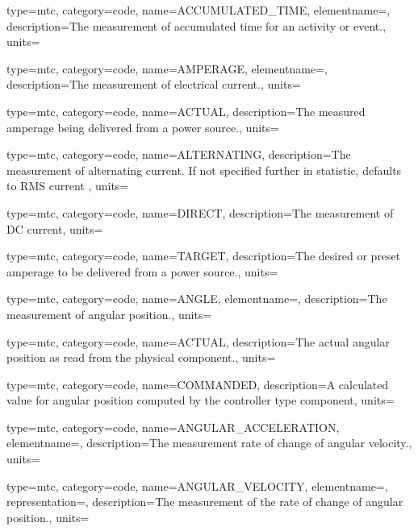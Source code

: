 {
  type=mtc,
  category=code,
  name={ACCUMULATED\_TIME},
  elementname=,
  description={The measurement of accumulated time for an activity or event.},
  units=
}

{
  type=mtc,
  category=code,
  name={AMPERAGE},
  elementname=,
  description={The measurement of electrical current.},
  units=
}

{
  type=mtc,
  category=code,
  name={ACTUAL},
  description={The measured amperage being delivered from a power source.},
  units=
}

{
  type=mtc,
  category=code,
  name={ALTERNATING},
  description={The measurement of alternating current.   If not specified further in statistic, defaults to RMS current  },
  units=
}

{
  type=mtc,
  category=code,
  name={DIRECT},
  description={The measurement of DC current},
  units=
}

{
  type=mtc,
  category=code,
  name={TARGET},
  description={The desired or preset amperage to be delivered from a power source.},
  units=
}

{
  type=mtc,
  category=code,
  name={ANGLE},
  elementname=,
  description={The measurement of angular position.},
  units=
}

{
  type=mtc,
  category=code,
  name={ACTUAL},
  description={The actual angular position as read from the physical component.},
  units=
}

{
  type=mtc,
  category=code,
  name={COMMANDED},
  description={A calculated value for angular position computed by the \gls{controller} type component},
  units=
}

{
  type=mtc,
  category=code,
  name={ANGULAR\_ACCELERATION},
  elementname=,
  description={The measurement rate of change of angular velocity.},
  units=
}

{
  type=mtc,
  category=code,
  name={ANGULAR\_VELOCITY},
  elementname=,
  representation=,
  description={The measurement of the rate of change of angular position.},
  units=
}

